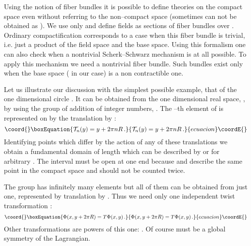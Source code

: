 \documentclass[a4paper,12pt]{article}
\def\cT{{\cal T}}
\def\bC{{\bf C}}
\def\bN{{\bf N}}
\def\RR{\mathbb R}
\def\ZZ{\mathbb Z}
\begin{document}
Using the notion of fiber bundles it is possible to define theories on
the compact space \myHighlight{$\bC$}\coordHE{} even without referring to the non--compact
space \myHighlight{$\bN$}\coordHE{} (sometimes \myHighlight{$\bC$}\coordHE{} can not be obtained as \myHighlight{$\bN/G$}\coordHE{}). We use
only \myHighlight{$\bC$}\coordHE{} and define fields as sections of fiber bundles over
\myHighlight{$\bC$}\coordHE{}. Ordinary compactification corresponds to a case when this fiber
bundle is trivial, i.e. just a product of the field space and the base
space. Using this formalism one can also check when a nontrivial
Scherk--Schwarz mechanism is at all possible. To apply this mechanism
we need a nontrivial fiber bundle. Such bundles exist only when the 
base space (\myHighlight{$\bC$}\coordHE{} in our case) is a non contractible one.


Let us illustrate our discussion with the simplest possible example,
that of the one dimensional circle \coordHE{}. 
It can be obtained from the one dimensional real space, \myHighlight{$\bN=\RR$}\coordHE{}, by
using the group of addition of integer numbers, \myHighlight{$G=\ZZ$}\coordHE{}. The \coordHE{}--th
element of \myHighlight{$\ZZ$}\coordHE{} is represented on \myHighlight{$\RR$}\coordHE{} by the translation by 
\coordHE{}:
\begin{equation}\coord{}\boxEquation{
\cT_n(y)=y+2\pi nR
\,.
\label{cTn}
}{
\cT_n(y)=y+2\pi nR
\,.
}{ecuacion}\coordE{}\end{equation}
Identifying points which differ by the action of any of these
translations we obtain a fundamental domain of length \coordHE{} which
can be described by \myHighlight{$y\in [y_0,y_0+2\pi R[$}\coordHE{} or 
\myHighlight{$y\in\,]y_0,y_0+2\pi R]$}\coordHE{} 
for arbitrary \coordHE{}. The interval must be open at one end because
\coordHE{} and \coordHE{} describe the same point in the compact
space and should not be counted twice. 


The group \myHighlight{$\ZZ$}\coordHE{} has infinitely many elements but all of them can be
obtained from just one, represented by translation by \coordHE{}. Thus
we need only one independent twist transformation \coordHE{}:
\begin{equation}\coord{}\boxEquation{
\Phi(x,y+2\pi R)= T\Phi(x,y)
\,.
}{
\Phi(x,y+2\pi R)= T\Phi(x,y)
\,.
}{ecuacion}\coordE{}\end{equation}
Other transformations are powers of this one: \coordHE{}.
Of course \coordHE{} must be a global symmetry of the Lagrangian.
\end{document}
